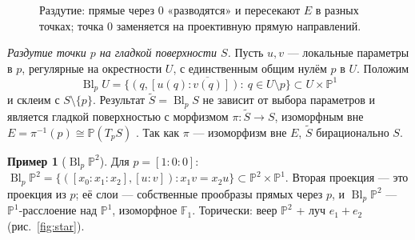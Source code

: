 \documentclass[11pt,a4paper]{article}
\theoremstyle{plain}
\theoremstyle{definition}
\newtheorem{example}[theorem]{Пример}
\theoremstyle{remark}
\newcommand{\PP}{\mathbb{P}}
\newcommand{\A}{\mathbb{A}}
\DeclareMathOperator{\Bl}{Bl}
\begin{document}
\begin{figure}[ht]
\centering
{}
\caption{Раздутие: прямые через $0$ «разводятся» и пересекают $E$ в разных точках; точка $0$ заменяется на
проективную прямую направлений.}
\label{fig:blowup}
\end{figure}

\emph{Раздутие точки $p$ на гладкой поверхности $S$.} Пусть $u,v$ --- локальные параметры в $p$, регулярные
на окрестности $U$, с единственным общим нулём $p$ в $U$. Положим
\[
\Bl_pU=\overline{\{(q,[u(q):v(q)]):\ q\in U\setminus p\}}\subset U\times\PP^1
\]
и склеим с $S\setminus\{p\}$. Результат $\tilde S=\Bl_pS$ не зависит от выбора параметров и является гладкой
поверхностью с морфизмом $\pi\colon\tilde S\to S$, изоморфным вне $E=\pi^{-1}(p)\cong\PP(T_pS)$
\cite[II.4]{Sh}. Так как $\pi$ --- изоморфизм вне $E$, $\tilde S$ бирационально $S$.

\begin{example}[$\Bl_p\PP^2$]
Для $p=[1:0:0]$:
$\Bl_p\PP^2=\{([x_0:x_1:x_2],[u:v]): x_1v=x_2u\}\subset\PP^2\times\PP^1$. Вторая проекция ---
это проекция из $p$; её слои --- собственные прообразы прямых через $p$, и $\Bl_p\PP^2$ ---
$\PP^1$-расслоение над $\PP^1$, изоморфное $\mathbb F_1$. Торически: веер $\PP^2$ + луч $e_1+e_2$
(рис.~\ref{fig:star}).
\end{example}
\end{document}

